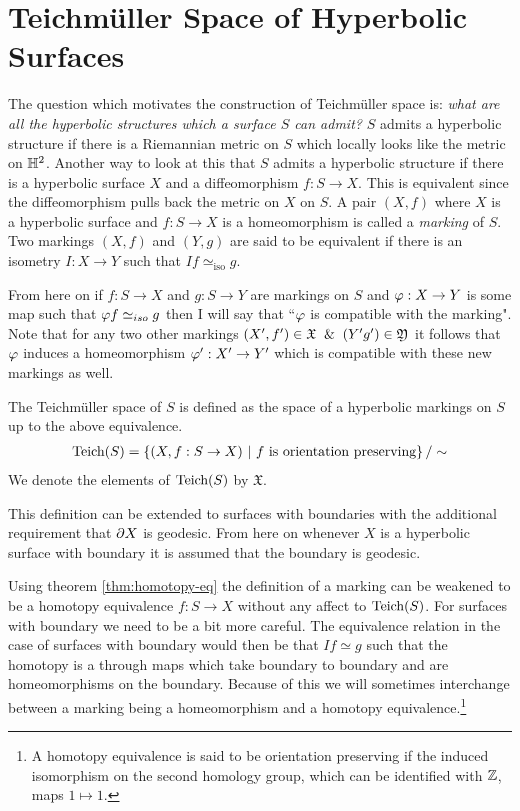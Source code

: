 \section{Teichm\"{u}ller Space of Hyperbolic Surfaces} %
The question which motivates the construction of Teichm\"{u}ller space is: \textit{what are all the hyperbolic structures which a surface $S$ can admit?} $S$ admits a hyperbolic structure if there is a Riemannian metric on $S$ which locally looks like the metric on $\mathbb{H}^2$. Another way to look at this that $S$ admits a hyperbolic structure if there is a hyperbolic surface $X$ and a diffeomorphism $f:S\to X$. This is equivalent since the diffeomorphism pulls back the metric on $X$ on $S$. A pair $(X,f)$ where $X$ is a hyperbolic surface and $f:S\to X$ is a homeomorphism is called a \textit{marking} of $S$. Two markings $(X,f)$ and $(Y,g)$ are said to be equivalent if there is an isometry $I:X\to Y$ such that $I f \simeq_{\text{iso}} g$.
\begin{rem}
  From here on if $f:S\to X$ and $g:S\to Y$ are markings on $S$ and $\varphi:X\to Y$ is some map such that $\varphi f \simeq_{iso} g$ then I will say that ``$\varphi$ is compatible with the marking". Note that for any two other markings $(X',f')\in \mathfrak{X} \And (Y'g')\in \mathfrak{Y}$ it follows that $\varphi$ induces a homeomorphism $\varphi' :X'\to Y'$ which is compatible with these new markings as well.
\end{rem}
\begin{definition}
  The Teichm\"{u}ller space of $S$ is defined as the space of a hyperbolic markings on $S$ up to the above equivalence.
  \begin{align}
    \text{Teich}(S) = \left\{(X,f:S\to X)\ |\ f\ \text{is orientation preserving}\right\}/\sim
  \end{align}
  We denote the elements of $\text{Teich}(S)$ by $ \mathfrak{X}$.
\end{definition}
This definition can be extended to surfaces with boundaries with the additional requirement that $\partial X$ is geodesic. From here on whenever $X$ is a hyperbolic surface with boundary it is assumed that the boundary is geodesic.
\begin{rem}
  Using theorem \ref{thm:homotopy-eq} the definition of a marking can be weakened to be a homotopy equivalence $f:S\to X$ without any affect to $\text{Teich}(S)$. For surfaces with boundary we need to be a bit more careful. The equivalence relation in the case of surfaces with boundary would then be that $If\simeq g$ such that the homotopy is a through maps which take boundary to boundary and are homeomorphisms on the boundary. Because of this we will sometimes interchange between a marking being a homeomorphism and a homotopy equivalence.\footnote{A homotopy equivalence is said to be orientation preserving if the induced isomorphism on the second homology group, which can be identified with $\mathbb{Z}$, maps $1\mapsto 1$.}
\end{rem}

